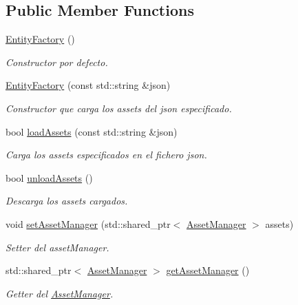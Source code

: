 \subsection*{Public Member Functions}
\begin{DoxyCompactItemize}
\item 
\hyperlink{classant_1_1_entity_factory_a771bc1c1e76874d157b3a58a8fbed3e2}{Entity\+Factory} ()
\begin{DoxyCompactList}\small\item\em Constructor por defecto. \end{DoxyCompactList}\item 
\hyperlink{classant_1_1_entity_factory_af5fe7f4ccf5f3aaea08e5cac7580de64}{Entity\+Factory} (const std\+::string \&json)
\begin{DoxyCompactList}\small\item\em Constructor que carga los assets del json especificado. \end{DoxyCompactList}\item 
bool \hyperlink{classant_1_1_entity_factory_a61c45ac377e5a9783cffaca1eeba6973}{load\+Assets} (const std\+::string \&json)
\begin{DoxyCompactList}\small\item\em Carga los assets especificados en el fichero json. \end{DoxyCompactList}\item 
bool \hyperlink{classant_1_1_entity_factory_adf142d95b439257857ccc1f98d7baf5e}{unload\+Assets} ()
\begin{DoxyCompactList}\small\item\em Descarga los assets cargados. \end{DoxyCompactList}\item 
void \hyperlink{classant_1_1_entity_factory_a3ac763b7d893ee9cd6b64fe00597a928}{set\+Asset\+Manager} (std\+::shared\+\_\+ptr$<$ \hyperlink{classant_1_1_asset_manager}{Asset\+Manager} $>$ assets)
\begin{DoxyCompactList}\small\item\em Setter del asset\+Manager. \end{DoxyCompactList}\item 
std\+::shared\+\_\+ptr$<$ \hyperlink{classant_1_1_asset_manager}{Asset\+Manager} $>$ \hyperlink{classant_1_1_entity_factory_ad13969f9c868d06aad4e68d6ff3e61d4}{get\+Asset\+Manager} ()
\begin{DoxyCompactList}\small\item\em Getter del \hyperlink{classant_1_1_asset_manager}{Asset\+Manager}. \end{DoxyCompactList}\item 

\end{DoxyCompactItemize}
